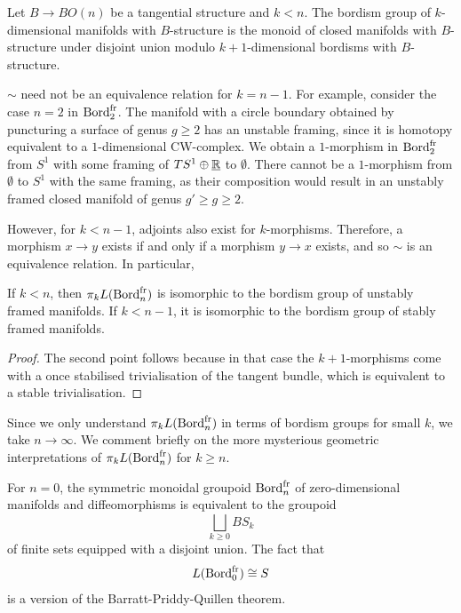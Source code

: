 \documentclass{amsart}
\begin{document}
\begin{definition}
    Let $B \to BO(n)$ be a tangential structure and $k<n$.
    The bordism group of $k$-dimensional manifolds with $B$-structure is the monoid of closed manifolds with $B$-structure under disjoint union modulo $k+1$-dimensional bordisms with $B$-structure.
\end{definition}


\begin{remark}
    $\sim$ need not be an equivalence relation for $k = n-1$.
    For example, consider the case $n = 2$ in $\operatorname{Bord}_2^{\mathrm{fr}}$.
    The manifold with a circle boundary obtained by puncturing a surface of genus $g\geq 2$ has an unstable framing, since it is homotopy equivalent to a $1$-dimensional CW-complex. We obtain a $1$-morphism in $\operatorname{Bord}_2^{\mathrm{fr}}$ from $S^1$ with some framing of $TS^1 \oplus \underline{\mathbb{R}}$ to $\emptyset$.
    There cannot be a $1$-morphism from $\emptyset$ to $S^1$ with the same framing, as their composition would result in an unstably framed closed manifold of genus $g' \geq g \geq 2$.
    
    However, for $k<n-1$, adjoints also exist for $k$-morphisms.
    Therefore, a morphism $x \to y$ exists if and only if a morphism $y \to x$ exists, and so $\sim$ is an equivalence relation.
    In particular, 
\end{remark}

\begin{corollary}\label{cor:bordism-groups}

If $k<n$, then $\pi_k L(\operatorname{Bord}_n^{\mathrm{fr}})$ is isomorphic to the bordism group of unstably framed manifolds.
If $k<n-1$, it is isomorphic to the bordism group of stably framed manifolds.
\end{corollary}
\begin{proof}
    The second point follows because in that case the $k+1$-morphisms come with a once stabilised trivialisation of the tangent bundle, which is equivalent to a stable trivialisation.
\end{proof}

Since we only understand $\pi_k L(\operatorname{Bord}_n^{\mathrm{fr}})$ in terms of bordism groups for small $k$, we take $n \to \infty$.
We comment briefly on the more mysterious geometric interpretations of $\pi_k L(\operatorname{Bord}_n^{\mathrm{fr}})$ for $k \geq n$.

\begin{example}
    For $n = 0$, the symmetric monoidal groupoid $\operatorname{Bord}_n^{\mathrm{fr}}$ of zero-dimensional manifolds and diffeomorphisms is equivalent to the groupoid 
    \[
    \bigsqcup_{k\geq 0} BS_k
    \]
    of finite sets equipped with a disjoint union.
    The fact that 
    \[
    L(\operatorname{Bord}_0^{\mathrm{fr}}) \cong S
    \]
    is a version of the Barratt-Priddy-Quillen theorem. 
\end{example}
\end{document}

